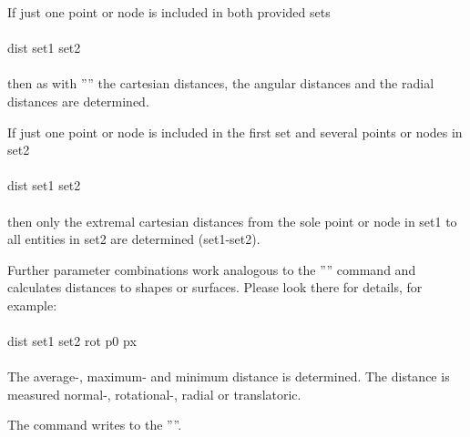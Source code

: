 \documentclass{article}
\begin{document}
If just one point or node is included in both provided sets \\\\
dist set1 set2 \\\\
then as with '''' the cartesian distances, the angular distances and the radial distances are determined.

If just one point or node is included in the first set and several points or nodes in set2 \\\\
dist set1 set2 \\\\
then only the extremal cartesian distances from the sole point or node in set1 to all entities in set2 are determined (set1-set2).

Further parameter combinations work analogous to the '''' command and calculates distances to shapes or surfaces. Please look there for details, for example:\\\\
dist set1 set2 rot p0 px \\\\
The average-, maximum- and minimum distance is determined. The distance is measured normal-, rotational-, radial or translatoric. 

The command writes to the ''''.
 
\end{document}
